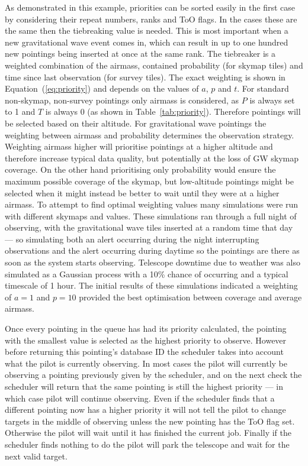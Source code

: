 \begin{colsection}
\begin{colsection}
As demonstrated in this example, priorities can be sorted easily in the first case by considering their repeat numbers, ranks and ToO flags. In the cases these are the same then the tiebreaking value is needed. This is most important when a new gravitational wave event comes in, which can result in up to one hundred new pointings being inserted at once at the same rank. The tiebreaker is a weighted combination of the airmass, contained probability (for skymap tiles) and time since last observation (for survey tiles). The exact weighting is shown in Equation~(\ref{eq:priority}) and depends on the values of $a$, $p$ and $t$. For standard non-skymap, non-survey pointings only airmass is considered, as $P$ is always set to 1 and $T$ is always 0 (as shown in Table~\ref{tab:priority}). Therefore pointings will be selected based on their altitude. For gravitational wave pointings the weighting between airmass and probability determines the observation strategy. Weighting airmass higher will prioritise pointings at a higher altitude and therefore increase typical data quality, but potentially at the loss of GW skymap coverage. On the other hand prioritising only probability would ensure the maximum possible coverage of the skymap, but low-altitude pointings might be selected when it might instead be better to wait until they were at a higher airmass. To attempt to find optimal weighting values many simulations were run with different skymaps and values. These simulations ran through a full night of observing, with the gravitational wave tiles inserted at a random time that day --- so simulating both an alert occurring during the night interrupting observations and the alert occurring during daytime so the pointings are there as soon as the system starts observing. Telescope downtime due to weather was also simulated as a Gaussian process with a 10\% chance of occurring and a typical timescale of 1 hour. The initial results of these simulations indicated a weighting of $a=1$ and $p=10$ provided the best optimisation between coverage and average airmass.

Once every pointing in the queue has had its priority calculated, the pointing with the smallest value is selected as the highest priority to observe. However before returning this pointing's database ID the  scheduler takes into account what the pilot is currently observing. In most cases the pilot will currently be observing a pointing previously given by the scheduler, and on the next check the scheduler will return that the same pointing is still the highest priority --- in which case pilot will continue observing. Even if the scheduler finds that a different pointing now has a higher priority it will not tell the pilot to change targets in the middle of observing unless the new pointing has the ToO flag set. Otherwise the pilot will wait until it has finished the current job. Finally if the scheduler finds nothing to do the pilot will park the telescope and wait for the next valid target.

\end{colsection}


\end{colsection}

